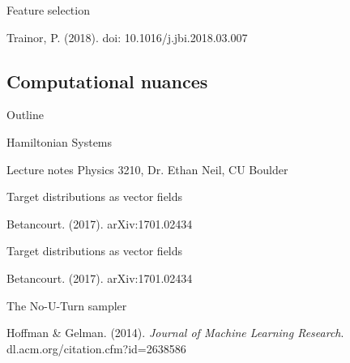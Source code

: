 \documentclass[xcolor=dvipsnames]{beamer}
\begin{document}
\begin{frame}{Feature selection}
	\vspace{-10pt}
	\begin{center}
		
		Trainor, P. (2018). doi: 10.1016/j.jbi.2018.03.007 
	\end{center}
\end{frame}

\subsection{Computational nuances}
\begin{frame}{Outline}
	\vspace{-10.5pt}
	\tableofcontents[currentsection,subsectionstyle=show/shaded/hide]
\end{frame}

\begin{frame}{Hamiltonian Systems}
	\vspace{-5pt}
	\begin{center}
		
		Lecture notes Physics 3210, Dr. Ethan Neil, CU Boulder
	\end{center}
\end{frame}

\begin{frame}{Target distributions as vector fields}
	\vspace{-5pt}
	\begin{center}
		
	Betancourt. (2017). arXiv:1701.02434
	\end{center}
\end{frame}

\begin{frame}{Target distributions as vector fields}
	\vspace{-5pt}
	\begin{center}
		
		Betancourt. (2017). arXiv:1701.02434
	\end{center}
\end{frame}

\begin{frame}{The No-U-Turn sampler}
	\vspace{-10pt}
	\begin{center}
		\vspace{2ex}
		Hoffman \& Gelman. (2014). \emph{Journal of Machine Learning Research}. dl.acm.org/citation.cfm?id=2638586
	\end{center}
\end{frame}
\end{document}
